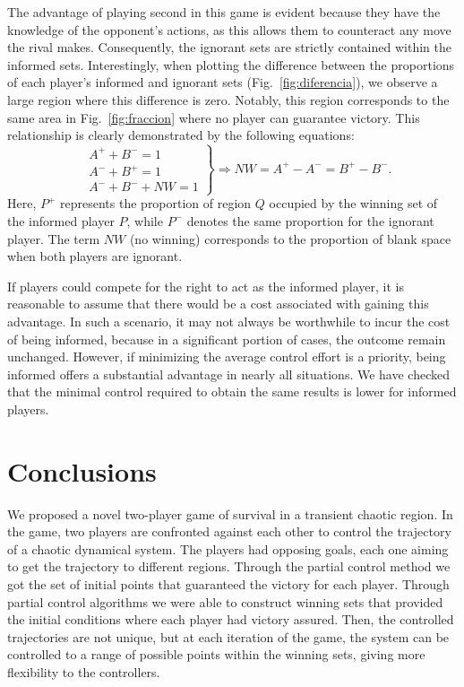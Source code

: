 The advantage of playing second in this game is evident because they have the knowledge of the opponent's actions, as this allows them to counteract any move the rival makes. Consequently, the ignorant sets are strictly contained within the informed sets. Interestingly, when plotting the difference between the proportions of each player's informed and ignorant sets (Fig.~\ref{fig:diferencia}), we observe a large region where this difference is zero. Notably, this region corresponds to the same area in Fig.~\ref{fig:fraccion} where no player can guarantee victory. This relationship is clearly demonstrated by the following equations:
\begin{equation}
   \left. \begin{array}{lll}
        &A^{+} + B^{-} = 1 \\
        &A^{-} + B^{+} = 1 \\
        &A^{-} + B^{-} + NW = 1
    \end{array}
    \right\} \Rightarrow NW = A^{+} - A^{-} = B^{+} - B^{-}.
\end{equation}
Here, $P^{+}$ represents the proportion of region $Q$ occupied by the winning set of the informed player $P$, while $P^{-}$ denotes the same proportion for the ignorant player. The term $NW$ (no winning) corresponds to the proportion of blank space when both players are ignorant.



If players could compete for the right to act as the informed player, it is reasonable to assume that there would be a cost associated with gaining this advantage. In such a scenario, it may not always be worthwhile to incur the cost of being informed, because in a significant portion of cases, the outcome remain unchanged. However, if minimizing the average control effort is a priority, being informed offers a substantial advantage in nearly all situations. We have checked that the minimal control required to obtain the same results is lower for informed players.



\section{Conclusions}

We proposed a novel two-player game of survival in a transient chaotic region. In the game, two players are confronted against each other to control the trajectory of a chaotic dynamical system. The players had opposing goals, each one aiming to get the trajectory to different regions. Through the partial control method we got the set of initial points that guaranteed the victory for each player. Through partial control algorithms we were able to construct winning sets that provided the initial conditions where each player had victory assured. Then, the controlled trajectories are not unique, but at each iteration of the game, the system can be controlled to a range of possible points within the winning sets, giving more flexibility to the controllers.

